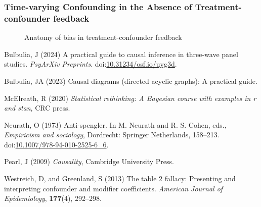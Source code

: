 \documentclass[
  single column]{article}
\newlength{\cslhangindent}
\newenvironment{CSLReferences}[2] %
 {\begin{list}{}{%
  \setlength{\itemindent}{0pt}
  \setlength{\leftmargin}{0pt}
  \setlength{\parsep}{0pt}
  \ifodd #1
   \setlength{\leftmargin}{\cslhangindent}
   \setlength{\itemindent}{-1\cslhangindent}
  \fi
  \setlength{\itemsep}{#2\baselineskip}}}
 {\end{list}}
\begin{document}
\newpage{}

\subsubsection{Time-varying Confounding in the Absence of
Treatment-confounder
feedback}\label{time-varying-confounding-in-the-absence-of-treatment-confounder-feedback}

\begin{figure}

\centering{

\feedbackB

}

\caption{\label{fig-timevarying-nofeedback}Anatomy of bias in
treatment-confounder feedback}

\end{figure}%

\newpage{}

\label{refs}
\begin{CSLReferences}{1}{0}
Bulbulia, J (2024) A practical guide to causal inference in three-wave
panel studies. \emph{PsyArXiv Preprints}.
doi:\href{https://doi.org/10.31234/osf.io/uyg3d}{10.31234/osf.io/uyg3d}.

Bulbulia, JA (2023) Causal diagrams (directed acyclic graphs): A
practical guide.

McElreath, R (2020) \emph{Statistical rethinking: A {B}ayesian course
with examples in r and stan}, CRC press.

Neurath, O (1973) Anti-spengler. In M. Neurath and R. S. Cohen, eds.,
\emph{Empiricism and sociology}, Dordrecht: Springer Netherlands,
158--213.
doi:\href{https://doi.org/10.1007/978-94-010-2525-6_6}{10.1007/978-94-010-2525-6\_6}.

Pearl, J (2009) \emph{Causality}, Cambridge University Press.

Westreich, D, and Greenland, S (2013) The table 2 fallacy: Presenting
and interpreting confounder and modifier coefficients. \emph{American
Journal of Epidemiology}, \textbf{177}(4), 292--298.

\end{CSLReferences}
\end{document}
